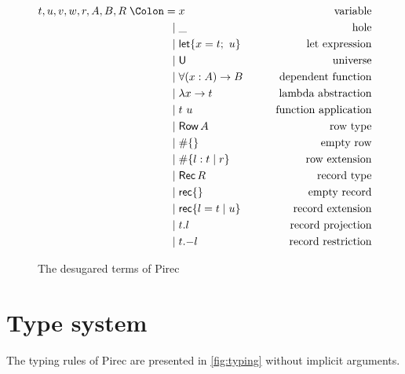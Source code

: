 \begin{figure}
  \begin{alignat*}{2}
    t, u, v, w, r, A, B, R \Coleqq{}
     & x
     & \qquad\text{variable}
    \\
    \mid{}
     & \_
     & \qquad\text{hole}
    \\
    \mid{}
     & {\Let \{ x = t;\ u \}}
     & \qquad\text{let expression}
    \\
    \mid{}
     & {\Univ}
     & \qquad\text{universe}
    \\
    \mid{}
     & \forall (x : A) \to B
     & \qquad\text{dependent function}
    \\
    \mid{}
     & \lambda x \to t
     & \qquad\text{lambda abstraction}
    \\
    \mid{}
     & t\ u
     & \qquad\text{function application}
    \\
    \mid{}
     & {\RowType A}
     & \qquad\text{row type}
    \\
    \mid{}
     & \# \{ \}
     & \qquad\text{empty row}
    \\
    \mid{}
     & \# \{ l : t \mid r \}
     & \qquad\text{row extension}
    \\
    \mid{}
     & {\RecordType R}
     & \qquad\text{record type}
    \\
    \mid{}
     & {\RecordLit \{ \}}
     & \qquad\text{empty record}
    \\
    \mid{}
     & {\RecordLit \{ l = t \mid u \}}
     & \qquad\text{record extension}
    \\
    \mid{}
     & t.l
     & \qquad\text{record projection}
    \\
    \mid{}
     & t \RecordRestr l
     & \qquad\text{record restriction}
  \end{alignat*}
  \caption{The desugared terms of Pirec}\label{fig:term}
\end{figure}

\section{Type system}

The typing rules of Pirec are presented in \cref{fig:typing} without implicit
arguments.

~\cite{scopedlabels}

